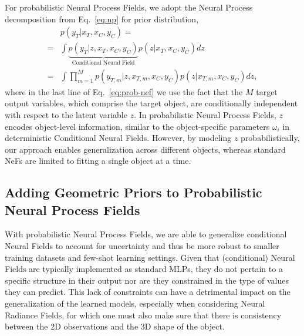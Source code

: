 
For probabilistic Neural Process Fields, we adopt the Neural Process decomposition from Eq.~\eqref{eq:np} for prior distribution,
\begin{align}
&p(y_T | x_T, x_C, y_C) = \label{eq:prob-nef} \\
=& \int \underbrace{p(y_T | z, x_T, x_C, y_C)}_{\text{Conditional Neural Field}} p(z | x_T, x_C, y_C) d z \nonumber \\
=& \int \prod_{m=1}^M p(y_{T, m} | z, x_{T, m}, x_C, y_C) p(z | x_{T, m}, x_C, y_C) d z, \nonumber
\end{align}
%
where in the last line of Eq.~\eqref{eq:prob-nef} we use the fact that the $M$ target output variables, which comprise the target object, are conditionally independent with respect to the latent variable $z$.
In probabilistic Neural Process Fields, \( z \) encodes object-level information, similar to the object-specific parameters \( \omega_i \) in deterministic Conditional Neural Fields. However, by modeling \( z \) probabilistically, our approach enables generalization across different objects, whereas standard NeFs are limited to fitting a single object at a time.





\subsection{Adding Geometric Priors to Probabilistic Neural Process Fields}

With probabilistic Neural Process Fields, we are able to generalize conditional Neural Fields to account for uncertainty and thus be more robust to smaller training datasets and few-shot learning settings.
Given that (conditional) Neural Fields are typically implemented as standard MLPs, they do not pertain to a specific structure in their output nor are they constrained in the type of values they can predict.
This lack of constraints can have a detrimental impact on the generalization of the learned models, especially when considering Neural Radiance Fields, for which one must also make sure that there is consistency between the 2D observations and the 3D shape of the object.

